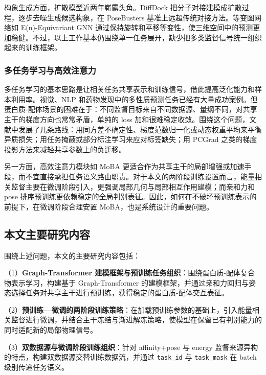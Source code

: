 构象生成方面，扩散模型近两年崭露头角。DiffDock\cite{corso2023diffdock} 把分子对接建模成扩散过程，逐步去噪生成候选构象，在 PoseBusters 基准上远超传统对接方法\cite{buttenschoen2024posebusters}。等变图网络如 E(n)-Equivariant GNN\cite{shen2022enet} 通过保持旋转和平移等变性，使三维空间中的预测更加稳健。不过，以上工作基本仍围绕单一任务展开，缺少把多类监督信号统一组织起来的训练框架。

\subsubsection{多任务学习与高效注意力}

多任务学习的基本思路是让相关任务共享表示和训练信号，借此提高泛化能力和样本利用率\cite{caruana1997multitask,ruder2017overview}。视觉、NLP 和药物发现中的多性质预测任务已经有大量成功案例\cite{kendall2018multi,liu2019end,wu2018moleculenet}。但蛋白质-配体场景的困难在于：不同监督目标来自不同数据源、量纲不同，对共享主干的梯度方向也常常矛盾，单纯的 loss 加和很难稳定收敛\cite{zhang2021survey}。围绕这个问题，文献中发展了几条路线：用同方差不确定性、梯度范数归一化或动态权重平均来平衡异质损失\cite{kendall2018multi,chen2018gradnorm,liu2019end}；用任务掩蔽或部分标注学习来应对标签缺失；用 PCGrad 之类的梯度投影方法来减轻共享参数上的负迁移\cite{yu2020gradient}。

另一方面，高效注意力模块如 MoBA 更适合作为共享主干的局部增强或加速手段，而不宜直接承担任务语义路由职责。对于本文的两阶段训练设置而言，能量相关监督主要在微调阶段引入，更强调局部几何与局部相互作用建模；而亲和力和 pose 排序预训练更依赖稳定的全局判别表征。因此，如何在不破坏预训练表示的前提下，在微调阶段合理安置 MoBA，也是系统设计的重要问题。

\subsection{本文主要研究内容}

围绕上述问题，本文的主要研究内容包括：

（1）\textbf{Graph-Transformer 建模框架与预训练任务组织}：围绕蛋白质-配体复合物表示学习，构建基于 Graph-Transformer 的建模框架，并通过亲和力回归与姿态选择任务对共享主干进行预训练，获得稳定的蛋白质-配体交互表征。

（2）\textbf{预训练—微调的两阶段训练策略}：在加载预训练参数的基础上，引入能量相关监督进行微调，并结合主干冻结与渐进解冻策略，使模型在保留已有判别能力的同时适配新的局部物理信号。

（3）\textbf{双数据源与微调阶段训练组织}：针对 affinity+pose 与 energy 监督来源异构的特点，构建双数据源交替训练数据流，并通过 \texttt{task\_id} 与 \texttt{task\_mask} 在 batch 级别传递任务语义。

